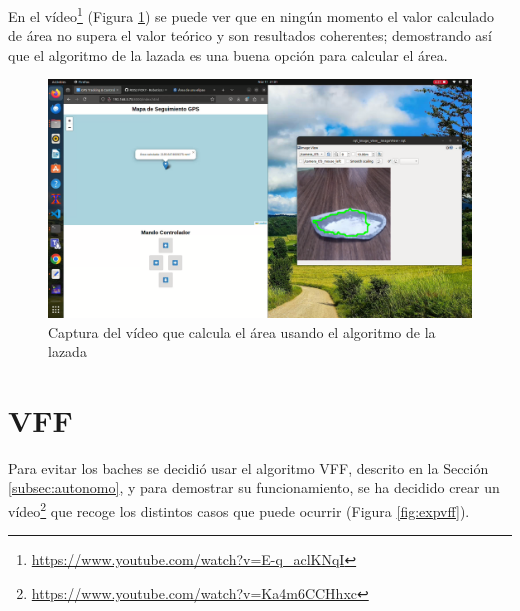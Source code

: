 En el vídeo\footnote{\url{https://www.youtube.com/watch?v=E-q_aclKNqI}} (Figura \ref{fig:expcapturalazada}) se puede ver que en ningún momento el valor calculado de área no supera el valor teórico y son resultados coherentes; demostrando así que el algoritmo de la lazada es una buena opción para calcular el área.
 
\begin{figure} [h!]
	\begin{center}
			\includegraphics[width=15cm]{figs/cap7/capturavideolazada.png}
		\end{center}
	\caption{Captura del vídeo que calcula el área usando el algoritmo de la lazada}
	\label{fig:expcapturalazada}
\end{figure}


\section{VFF}
\label{sec:expvff}
Para evitar los baches se decidió usar el algoritmo \ac{VFF}, descrito en la Sección \ref{subsec:autonomo}, y para demostrar su funcionamiento, se ha decidido crear un vídeo\footnote{\url{https://www.youtube.com/watch?v=Ka4m6CCHhxc}} que recoge los distintos casos que puede ocurrir (Figura \ref{fig:expvff}).  


